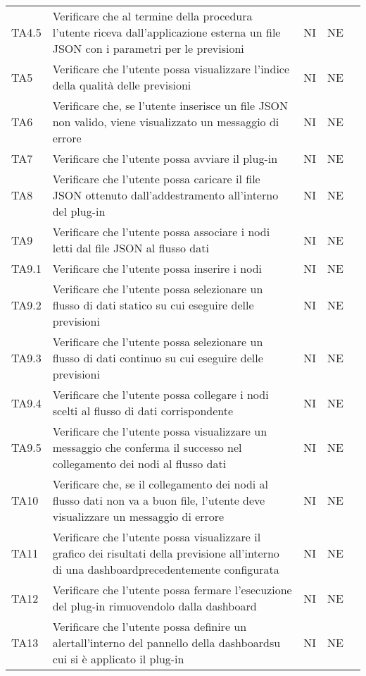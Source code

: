 \begin{longtable} {
		>{}p{15mm} 
		>{}p{79.5mm}
		>{}p{15mm} 
		>{}p{15mm}
		>{}p{0mm}}
	TA4.5	& Verificare che al termine della procedura l'utente riceva dall'applicazione esterna un file JSON con i parametri per le previsioni & NI & NE  &\TBstrut \\ [2mm]
	TA5		& Verificare che l'utente possa visualizzare l'indice della qualità delle previsioni & NI & NE  &\TBstrut \\ [2mm]
	TA6		& Verificare che, se l'utente inserisce un file JSON non valido, viene visualizzato un messaggio di errore & NI & NE  &\TBstrut \\ [2mm]
	TA7		& Verificare che l'utente possa avviare il plug-in & NI & NE  &\TBstrut \\ [2mm]
	TA8		& Verificare che l'utente possa caricare il file JSON ottenuto dall'addestramento all'interno del plug-in & NI & NE  &\TBstrut \\ [2mm]
	TA9		& Verificare che l'utente possa associare i nodi letti dal file JSON al flusso dati & NI & NE  &\TBstrut \\ [2mm]
	TA9.1	& Verificare che l'utente possa inserire i nodi & NI & NE  &\TBstrut \\ [2mm]
	TA9.2	& Verificare che l'utente possa selezionare un flusso di dati statico su cui eseguire delle previsioni & NI & NE  &\TBstrut \\ [2mm]
	TA9.3	& Verificare che l'utente possa selezionare un flusso di dati continuo su cui eseguire delle previsioni & NI & NE  &\TBstrut \\ [2mm]
	TA9.4	& Verificare che l'utente possa collegare i nodi scelti al flusso di dati corrispondente & NI & NE  &\TBstrut \\ [2mm]
	TA9.5	& Verificare che l'utente possa visualizzare un messaggio che conferma il successo nel collegamento dei nodi al flusso dati & NI & NE  &\TBstrut \\ [2mm]
	TA10	& Verificare che, se il collegamento dei nodi al flusso dati non va a buon file, l'utente deve visualizzare un messaggio di errore & NI & NE  &\TBstrut \\ [2mm]
	TA11	& Verificare che l'utente possa visualizzare il grafico dei risultati della previsione all'interno di una dashboard\glosp precedentemente configurata & NI & NE  &\TBstrut \\ [2mm]
	TA12	& Verificare che l'utente possa fermare l'esecuzione del plug-in rimuovendolo dalla dashboard\glo & NI & NE  &\TBstrut \\ [2mm]
	TA13	& Verificare che l'utente possa definire un alert\glosp all'interno del pannello della dashboard\glosp su cui si è applicato il plug-in & NI & NE  &\TBstrut \\ [2mm]

\end{longtable}
